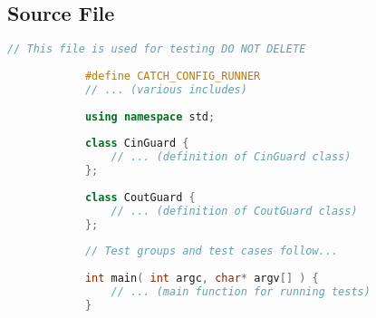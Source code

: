 \documentclass{article}
\begin{document}
	\subsection*{Source File}
	\begin{mdframed}[backgroundcolor=background, hidealllines=false, innerleftmargin=15pt, innerrightmargin=5pt, innertopmargin=0pt, innerbottommargin=-5pt, linecolor=accent]
		\begin{lstlisting}[language=C++]
			// This file is used for testing DO NOT DELETE
			
			#define CATCH_CONFIG_RUNNER
			// ... (various includes)
			
			using namespace std;
			
			class CinGuard {
				// ... (definition of CinGuard class)
			};
			
			class CoutGuard {
				// ... (definition of CoutGuard class)
			};
			
			// Test groups and test cases follow...
			
			int main( int argc, char* argv[] ) {
				// ... (main function for running tests)
			}
		\end{lstlisting}
	\end{mdframed}
	
\end{document}
